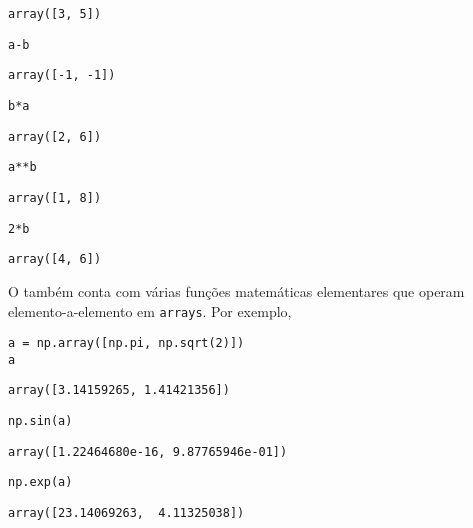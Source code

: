 \documentclass[a4paper,10pt,twoside]{article}
\begin{document}
\begin{verbatim}
array([3, 5])
\end{verbatim}

\begin{lstlisting}
a-b
\end{lstlisting}

\begin{verbatim}
array([-1, -1])
\end{verbatim}

\begin{lstlisting}
b*a
\end{lstlisting}

\begin{verbatim}
array([2, 6])
\end{verbatim}

\begin{lstlisting}
a**b
\end{lstlisting}

\begin{verbatim}
array([1, 8])
\end{verbatim}

\begin{lstlisting}
2*b
\end{lstlisting}

\begin{verbatim}
array([4, 6])
\end{verbatim}


O {\numpy} também conta com várias funções matemáticas elementares que operam elemento-a-elemento em \texttt{arrays}. Por exemplo,

\begin{lstlisting}
a = np.array([np.pi, np.sqrt(2)])
a
\end{lstlisting}

\begin{verbatim}
array([3.14159265, 1.41421356])
\end{verbatim}

\begin{lstlisting}
np.sin(a)
\end{lstlisting}

\begin{verbatim}
array([1.22464680e-16, 9.87765946e-01])
\end{verbatim}

\begin{lstlisting}
np.exp(a)
\end{lstlisting}

\begin{verbatim}
array([23.14069263,  4.11325038])
\end{verbatim}
\end{document}
